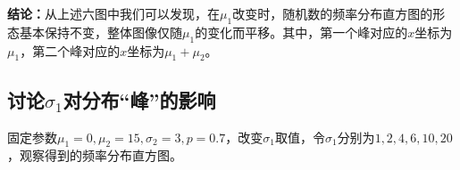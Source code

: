 \documentclass[CJK]{ctexart}
\begin{document}
\textbf{结论：}从上述六图中我们可以发现，在$\mu_1$改变时，随机数的频率分布直方图的形态基本保持不变，整体图像仅随$\mu_1$的变化而平移。其中，第一个峰对应的$x$坐标为$\mu_1$，第二个峰对应的$x$坐标为$\mu_1+\mu_2$。

\subsection{讨论$\sigma_1$对分布“峰”的影响}

固定参数$\mu_1=0,\mu_2=15,\sigma_2=3,p=0.7$，改变$\sigma_1$取值，令$\sigma_1$分别为$1,2,4,6,10,20$，观察得到的频率分布直方图。

\begin{figure}[H]
    \centering
    \quad
    \quad
    \quad
    \quad

\end{figure}
\end{document}
